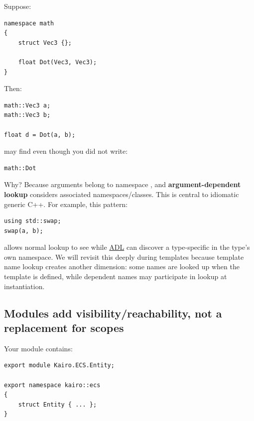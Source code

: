 Suppose:

\begin{verbatim}
namespace math
{
    struct Vec3 {};

    float Dot(Vec3, Vec3);
}
\end{verbatim}

Then:

\begin{verbatim}
math::Vec3 a;
math::Vec3 b;

float d = Dot(a, b);
\end{verbatim}

may find  even though you did not write:

\begin{verbatim}
math::Dot
\end{verbatim}

Why? Because arguments belong to namespace , and \textbf{argument-dependent lookup} considers associated namespaces/classes. This is central to idiomatic generic C++. For example, this pattern:

\begin{verbatim}
using std::swap;
swap(a, b);
\end{verbatim}

allows normal lookup to see  while \hyperref[appendix-7863714aa97f]{ADL} can discover a type-specific  in the type's own namespace. We will revisit this deeply during templates because template name lookup creates another dimension: some names are looked up when the template is defined, while dependent names may participate in lookup at instantiation.

\subsection{Modules add visibility/reachability, not a replacement for scopes}\label{01-foundations-i-ch002-modules-add-visibilityreachability-not-a-replacement-for-scopes}

\hypertarget{01-foundations-i-ch002-modules-add-visibilityreachability-not-a-replacement-for-scopes}{}

Your module contains:

\begin{verbatim}
export module Kairo.ECS.Entity;

export namespace kairo::ecs
{
    struct Entity { ... };
}
\end{verbatim}

